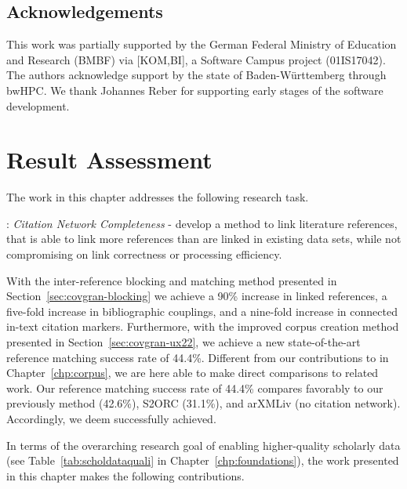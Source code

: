 \subsection{Acknowledgements}
This work was partially supported by the German Federal Ministry of Education and Research (BMBF) via [KOM,BI], a Software Campus project (01IS17042).
The authors acknowledge support by the state of Baden-W{\"u}rttemberg through bwHPC.
We thank Johannes Reber for supporting early stages of the software development.

\section{Result Assessment}
\label{sec:covgran-assessment}

The work in this chapter addresses the following research task.

\begin{rtlist}
    \item[\rtmark{2}:] \textit{Citation Network Completeness} - develop a method to link literature references, that is able to link more references than are linked in existing data sets, while not compromising on link correctness or processing efficiency.
\end{rtlist}

With the inter-reference blocking and matching method presented in Section~\ref{sec:covgran-blocking} we achieve a 90\% increase in linked references, a five-fold increase in bibliographic couplings, and a nine-fold increase in connected in-text citation markers.
Furthermore, with the improved corpus creation method presented in Section~\ref{sec:covgran-ux22}, we achieve a new state-of-the-art reference matching success rate of 44.4\%. Different from our contributions to  in Chapter~\ref{chp:corpus}, we are here able to make direct comparisons to related work. Our reference matching success rate of 44.4\% compares favorably to our previously method (42.6\%), S2ORC (31.1\%), and arXMLiv (no citation network). Accordingly, we deem  successfully achieved.

In terms of the overarching research goal of enabling higher-quality scholarly data (see Table~\ref{tab:scholdataquali} in Chapter~\ref{chp:foundations}), the work presented in this chapter makes the following contributions.

